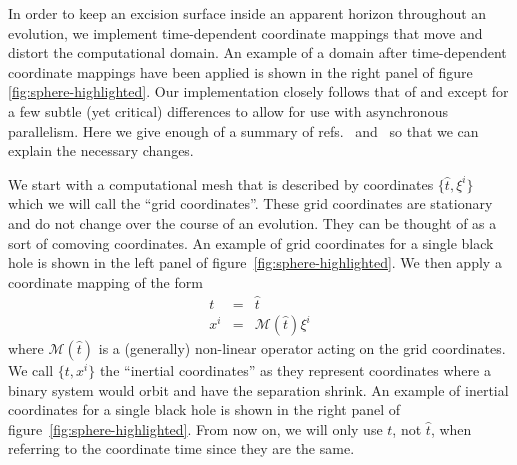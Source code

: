 \begin{bibunit}[unsrtnat]
In order to keep an excision surface inside an apparent horizon throughout an
evolution, we implement time-dependent coordinate mappings that move and distort
the computational domain. An example of a domain after time-dependent coordinate
mappings have been applied is shown in the right panel of figure
\ref{fig:sphere-highlighted}. Our implementation closely follows that of
\cite{Scheel:2006gg} and \cite{Hemberger:2012jz} except for a few subtle (yet
critical) differences to allow for use with asynchronous parallelism. Here we
give enough of a summary of refs.~\cite{Scheel:2006gg}
and~\cite{Hemberger:2012jz} so that we can explain the necessary changes.

We start with a computational mesh that is described by coordinates $\{\hat{t},
\xi^{i}\}$ which we will call the ``grid coordinates''. These grid coordinates
are stationary and do not change over the course of an evolution. They can be
thought of as a sort of comoving coordinates. An example of grid coordinates for
a single black hole is shown in the left panel of
figure~\ref{fig:sphere-highlighted}. We then apply a coordinate mapping of the
form
\begin{eqnarray}
  t &=& \hat{t} \\
  x^{i} &=& \mathcal{M}(\hat{t}) \xi^{i}
\end{eqnarray}
where $\mathcal{M}(\hat{t})$ is a (generally) non-linear operator acting on the
grid coordinates.
We call $\{t, x^{i}\}$ the ``inertial coordinates'' as they represent
coordinates where a binary system would orbit and have the separation shrink. An
example of inertial coordinates for a single black hole is shown in the right
panel of figure~\ref{fig:sphere-highlighted}. From now on, we will only use $t$,
not $\hat{t}$, when referring to the coordinate time since they are the same.


\end{bibunit}

